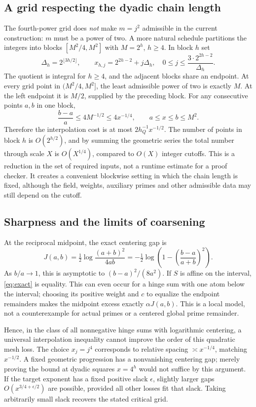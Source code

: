 \documentclass[11pt,a4paper]{article}
\theoremstyle{remark}\newtheorem{remark}[theorem]{Remark}
\begin{document}
\subsection{A grid respecting the dyadic chain length}
The fourth-power grid does \emph{not} make $m=j^2$ admissible in the current construction: $m$ must be a power of two. A more natural schedule partitions the integers into blocks $[M^2/4,M^2]$ with $M=2^h$, $h\ge4$. In block $h$ set
\[\Delta_h=2^{\lfloor3h/2\rfloor},\qquad
x_{h,j}=2^{2h-2}+j\Delta_h,\quad
0\le j\le \frac{3\cdot2^{2h-2}}{\Delta_h}.\]
The quotient is integral for $h\ge4$, and the adjacent blocks share an endpoint. At every grid point in $(M^2/4,M^2]$, the least admissible power of two is exactly $M$. At the left endpoint it is $M/2$, supplied by the preceding block. For any consecutive points $a,b$ in one block,
\[\frac{b-a}{a}\le4M^{-1/2}\le4x^{-1/4},\qquad a\le x\le b\le M^2.\]
Therefore the interpolation cost is at most $2h_Q^{-1}x^{-1/2}$. The number of points in block $h$ is $O(2^{h/2})$, and by summing the geometric series the total number through scale $X$ is $O(X^{1/4})$, compared to $O(X)$ integer cutoffs. This is a reduction in the set of required inputs, not a runtime estimate for a proof checker. It creates a convenient blockwise setting in which the chain length is fixed, although the field, weights, auxiliary primes and other admissible data may still depend on the cutoff.

\subsection{Sharpness and the limits of coarsening}
At the reciprocal midpoint, the exact centering gap is
\begin{equation}\label{eq:gap}
J(a,b)=\tfrac12\log\frac{(a+b)^2}{4ab}=-\tfrac12\log\left(1-\left(\frac{b-a}{a+b}\right)^2\right).
\end{equation}
As $b/a\to1$, this is asymptotic to $(b-a)^2/(8a^2)$. If $S$ is affine on the interval, \eqref{eq:exact} is equality. This can even occur for a hinge sum with one atom below the interval; choosing its positive weight and $c$ to equalize the endpoint remainders makes the midpoint excess exactly $\alpha J(a,b)$. This is a local model, not a counterexample for actual primes or a centered global prime remainder.

Hence, in the class of all nonnegative hinge sums with logarithmic centering, a universal interpolation inequality cannot improve the order of this quadratic mesh loss. The choice $x_j=j^4$ corresponds to relative spacing $\asymp x^{-1/4}$, matching $x^{-1/2}$. A fixed geometric progression has a nonvanishing centering gap; merely proving the bound at dyadic squares $x=4^h$ would not suffice by this argument. If the target exponent has a fixed positive slack $\epsilon$, slightly larger gaps $O(x^{3/4+\epsilon/2})$ are possible, provided all other losses fit that slack. Taking arbitrarily small slack recovers the stated critical grid.
\end{document}
